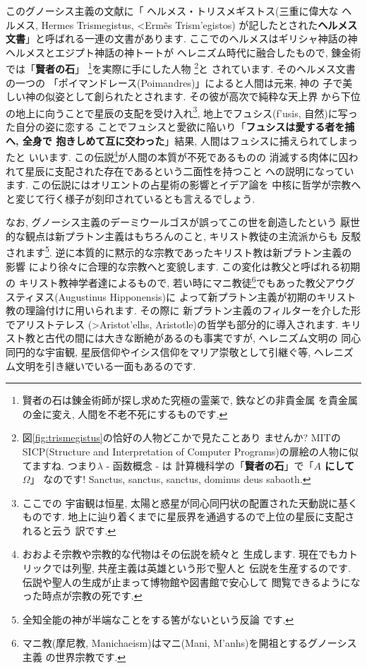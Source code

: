 \documentclass[b5j,8pt,twocolumn]{ltjsarticle}
\newcommand{\textgreek}[1]{\begingroup\fontencoding{LGR}\selectfont#1\endgroup}
\begin{document}
このグノーシス主義の文献に「 ヘルメス・トリスメギストス(三重に偉大な
ヘルメス, Hermes Trismegistus, \textgreek{<Erm\~es Trism'egistos})
が記したとされた\textbf{ヘルメス文書}」と呼ばれる一連の文書があります.
 ここでのヘルメスはギリシャ神話の神ヘルメスとエジプト神話の神トートが
ヘレニズム時代に融合したもので, 錬金術では「\textbf{賢者の石}」
\footnote{賢者の石は錬金術師が探し求めた究極の霊薬で, 鉄などの非貴金属
を貴金属の金に変え, 人間を不老不死にするものです.}を実際に手にした人物
\footnote{図\ref{fig:trismegistus}の恰好の人物どこかで見たことあり
ませんか? MITのSICP(Structure and Interpretation of Computer
 Programs)の扉絵の人物に似てますね. つまり$\lambda$ - 函数概念 - は
計算機科学の「\textbf{賢者の石}」で「\textbf{$A$ にして $\Omega$}」
なのです! Sanctus, sanctus, sanctus, dominus deus sabaoth.}と
されています\cite{錬金術}. そのヘルメス文書の一つの
「ポイマンドレース(Poimandres)」\cite{柴田}によると人間は元来, 神の
子で美しい神の似姿として創られたとされます. その彼が高次で純粋な天上界
から下位の地上に向うことで星辰の支配を受け入れ\footnote{ここでの
宇宙観は恒星, 太陽と惑星が同心同円状の配置された天動説に基くものです.
 地上に辿り着くまでに星辰界を通過するので上位の星辰に支配されると云う
訳です.}, 地上でフュシス(\textgreek{f'usis}, 自然)に写った自分の姿に恋する
ことでフュシスと愛欲に陥いり「\textbf{フュシスは愛する者を捕へ, 全身で
抱きしめて互に交わった}」結果, 人間はフュシスに捕えられてしまったと
いいます. この伝説\footnote{おおよそ宗教や宗教的な代物はその伝説を続々と
生成します. 現在でもカトリックでは列聖, 共産主義は英雄という形で聖人と
伝説を生産するのです. 伝説や聖人の生成が止まって博物館や図書館で安心して
閲覧できるようになった時点が宗教の死です.}が人間の本質が不死であるものの
消滅する肉体に囚われて星辰に支配された存在であるという二面性を持つこと
への説明になっています. この伝説にはオリエントの占星術の影響とイデア論を
中核に哲学が宗教へと変じて行く様子が刻印されているとも言えるでしょう.
\newline

なお, グノーシス主義のデーミウールゴスが誤ってこの世を創造したという
厭世的な観点は新プラトン主義はもちろんのこと, キリスト教徒の主流派からも
反駁されます\footnote{全知全能の神が半端なことをする筈がないという反論
です.}. 逆に本質的に黙示的な宗教であったキリスト教は新プラトン主義の影響
により徐々に合理的な宗教へと変貌します. この変化は教父と呼ばれる初期の
キリスト教神学者達によるもので, 若い時にマニ教徒\footnote{マニ教(摩尼教,
 Manichaeism)はマニ(Mani, \textgreek{M'anhs})を開祖とするグノーシス主義
の世界宗教です.}でもあった教父アウグスティヌス(Augustinus Hipponensis)に
よって新プラトン主義が初期のキリスト教の理論付けに用いられます. その際に
新プラトン主義のフィルターを介した形でアリストテレス
(\textgreek{>Aristot'elhs}, Aristotle)の哲学も部分的に導入されます.
 キリスト教と古代の間には大きな断絶があるのも事実ですが, ヘレニズム文明の
同心同円的な宇宙観, 星辰信仰やイシス信仰をマリア崇敬として引継ぐ等,
 ヘレニズム文明を引き継いでいる一面もあるのです.
\newline
\end{document}
